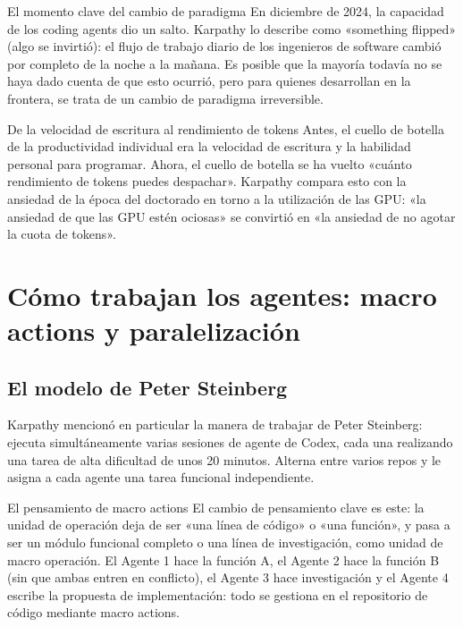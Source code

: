 \documentclass[a4paper]{article}
\begin{document}
\begin{importantbox}{El momento clave del cambio de paradigma}
En diciembre de 2024, la capacidad de los coding agents dio un salto. Karpathy lo describe como «something flipped» (algo se invirtió): el flujo de trabajo diario de los ingenieros de software cambió por completo de la noche a la mañana. Es posible que la mayoría todavía no se haya dado cuenta de que esto ocurrió, pero para quienes desarrollan en la frontera, se trata de un cambio de paradigma irreversible.
\end{importantbox}

\begin{knowledgebox}{De la velocidad de escritura al rendimiento de tokens}
Antes, el cuello de botella de la productividad individual era la velocidad de escritura y la habilidad personal para programar. Ahora, el cuello de botella se ha vuelto «cuánto rendimiento de tokens puedes despachar». Karpathy compara esto con la ansiedad de la época del doctorado en torno a la utilización de las GPU: «la ansiedad de que las GPU estén ociosas» se convirtió en «la ansiedad de no agotar la cuota de tokens».
\end{knowledgebox}

\section{Cómo trabajan los agentes: macro actions y paralelización}

\subsection{El modelo de Peter Steinberg}

Karpathy mencionó en particular la manera de trabajar de Peter Steinberg: ejecuta simultáneamente varias sesiones de agente de Codex, cada una realizando una tarea de alta dificultad de unos 20 minutos. Alterna entre varios repos y le asigna a cada agente una tarea funcional independiente.

\begin{importantbox}{El pensamiento de macro actions}
El cambio de pensamiento clave es este: la unidad de operación deja de ser «una línea de código» o «una función», y pasa a ser un módulo funcional completo o una línea de investigación, como unidad de macro operación. El Agente 1 hace la función A, el Agente 2 hace la función B (sin que ambas entren en conflicto), el Agente 3 hace investigación y el Agente 4 escribe la propuesta de implementación: todo se gestiona en el repositorio de código mediante macro actions.
\end{importantbox}
\end{document}
